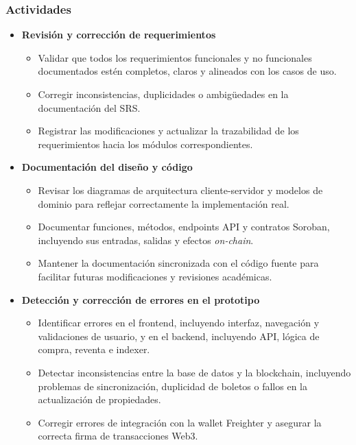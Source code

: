 \documentclass[12pt,a4paper]{article}
\begin{document}
\subsubsection{Actividades}
\begin{itemize}
    \item \textbf{Revisión y corrección de requerimientos}
    \begin{itemize}
        \item Validar que todos los requerimientos funcionales y no funcionales
        documentados estén completos, claros y alineados con los casos de uso.
        \item Corregir inconsistencias, duplicidades o ambigüedades en la
        documentación del SRS.
        \item Registrar las modificaciones y actualizar la trazabilidad de los
        requerimientos hacia los módulos correspondientes.
    \end{itemize}

    \item \textbf{Documentación del diseño y código}
    \begin{itemize}
        \item Revisar los diagramas de arquitectura cliente-servidor y
        modelos de dominio para reflejar correctamente la implementación real.
        \item Documentar funciones, métodos, endpoints API y contratos Soroban,
        incluyendo sus entradas, salidas y efectos \textit{on-chain}.
        \item Mantener la documentación sincronizada con el código fuente para
        facilitar futuras modificaciones y revisiones académicas.
    \end{itemize}

    \item \textbf{Detección y corrección de errores en el prototipo}
    \begin{itemize}
        \item Identificar errores en el frontend, incluyendo interfaz, navegación
        y validaciones de usuario, y en el backend, incluyendo API, lógica de
        compra, reventa e indexer.
        \item Detectar inconsistencias entre la base de datos y la blockchain,
        incluyendo problemas de sincronización, duplicidad de boletos o fallos en
        la actualización de propiedades.
        \item Corregir errores de integración con la wallet Freighter y asegurar
        la correcta firma de transacciones Web3.
    \end{itemize}


\end{itemize}
\end{document}
